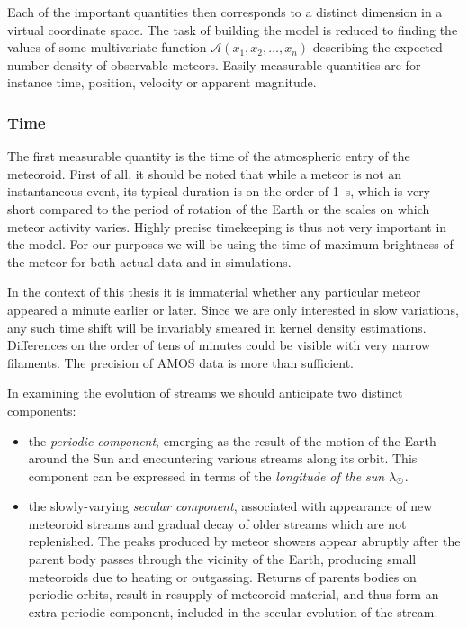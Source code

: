         Each of the important quantities then corresponds to a distinct dimension in a virtual coordinate space.
        The task of building the model is reduced to finding the values of some multivariate
        function $\mathcal{A}(x_1, x_2, \ldots, x_n)$ describing the expected number density of observable meteors.
        Easily measurable quantities are for instance time, position, velocity or apparent magnitude.

        \subsubsection{Time} \label{mspt}
            The first measurable quantity is the time of the atmospheric entry of the meteoroid.
            First of all, it should be noted that while a meteor is not an instantaneous event,
            its typical duration is on the order of \SI{1}{\second}, which is very short compared to the
            period of rotation of the Earth or the scales on which meteor activity varies.
            Highly precise timekeeping is thus not very important in the model.
            For our purposes we will be using the time of maximum brightness
            of the meteor for both actual data and in simulations.

            In the context of this thesis it is immaterial whether any particular meteor
            appeared a minute earlier or later. Since we are only interested in slow variations,
            any such time shift will be invariably smeared in kernel density estimations.
            Differences on the order of tens of minutes could be visible with very narrow filaments.
            The precision of AMOS data is more than sufficient.

            In examining the evolution of streams we should anticipate two distinct components:
            \begin{itemize}
                \item the \emph{periodic component}, emerging as the result of the motion of the Earth
                    around the Sun and encountering various streams along its orbit.
                    This component can be expressed in terms of the \emph{longitude of the sun} $\lambda_\Sun$.

                \item the slowly-varying \emph{secular component}, associated with appearance of new meteoroid
                    streams and gradual decay of older streams which are not replenished.
                    The peaks produced by meteor showers appear abruptly after the parent body
                    passes through the vicinity of the Earth, producing small meteoroids due to heating or outgassing.
                    Returns of parents bodies on periodic orbits, result in resupply of meteoroid material,
                    and thus form an extra periodic component, included in the secular evolution of the stream.
            \end{itemize}

